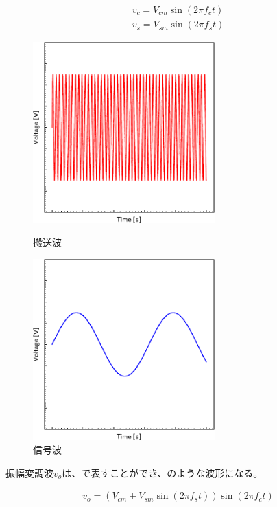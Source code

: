 \documentclass[report.tex]{subfiles}
\begin{document}
\begin{align}
	v_c = V_{cm} \sin(2 \pi f_c t) \label{eq:v_c} \\
	v_s = V_{sm} \sin(2 \pi f_s t) \label{eq:v_s}
\end{align}

\begin{figure}[H]
	\begin{minipage}[b]{0.5\columnwidth}
		\centering
		\includegraphics[width=7cm]{fig/5V.pdf}
		\caption{搬送波}
		\label{fig:5V}
	\end{minipage}
	\begin{minipage}[b]{0.5\columnwidth}
		\centering
		\includegraphics[width=7cm]{fig/3V.pdf}
		\caption{信号波}
		\label{fig:3V}
	\end{minipage}
\end{figure}

振幅変調波\(v_o\)は、で表すことができ、のような波形になる。

\begin{align}
	v_o = (V_{cm} + V_{sm} \sin(2 \pi f_s t)) \sin(2 \pi f_c t) \label{eq:v_o}
\end{align}
\end{document}
